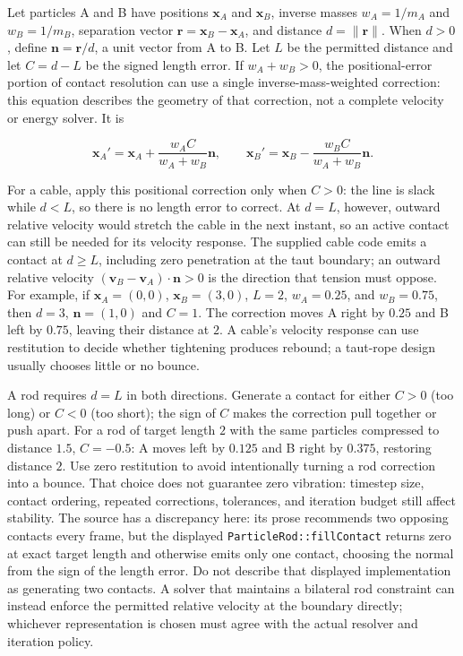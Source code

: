 Let particles A and B have positions \(\mathbf{x}_A\) and \(\mathbf{x}_B\), inverse masses \(w_A=1/m_A\) and \(w_B=1/m_B\), separation vector \(\mathbf{r}=\mathbf{x}_B-\mathbf{x}_A\), and distance \(d=\lVert\mathbf{r}\rVert\). When \(d>0\), define \(\mathbf{n}=\mathbf{r}/d\), a unit vector from A to B. Let \(L\) be the permitted distance and let \(C=d-L\) be the signed length error. If \(w_A+w_B>0\), the positional-error portion of contact resolution can use a single inverse-mass-weighted correction: this equation describes the geometry of that correction, not a complete velocity or energy solver. It is

\[
\mathbf{x}_A' = \mathbf{x}_A + \frac{w_A C}{w_A+w_B}\mathbf{n}, \qquad
\mathbf{x}_B' = \mathbf{x}_B - \frac{w_B C}{w_A+w_B}\mathbf{n}.
\]

For a cable, apply this positional correction only when \(C>0\): the line is slack while \(d<L\), so there is no length error to correct. At \(d=L\), however, outward relative velocity would stretch the cable in the next instant, so an active contact can still be needed for its velocity response. The supplied cable code emits a contact at \(d\geq L\), including zero penetration at the taut boundary; an outward relative velocity \((\mathbf v_B-\mathbf v_A)\cdot\mathbf n>0\) is the direction that tension must oppose. For example, if \(\mathbf{x}_A=(0,0)\), \(\mathbf{x}_B=(3,0)\), \(L=2\), \(w_A=0.25\), and \(w_B=0.75\), then \(d=3\), \(\mathbf{n}=(1,0)\) and \(C=1\). The correction moves A right by \(0.25\) and B left by \(0.75\), leaving their distance at \(2\). A cable's velocity response can use restitution to decide whether tightening produces rebound; a taut-rope design usually chooses little or no bounce.

A rod requires \(d=L\) in both directions. Generate a contact for either \(C>0\) (too long) or \(C<0\) (too short); the sign of \(C\) makes the correction pull together or push apart. For a rod of target length \(2\) with the same particles compressed to distance \(1.5\), \(C=-0.5\): A moves left by \(0.125\) and B right by \(0.375\), restoring distance \(2\). Use zero restitution to avoid intentionally turning a rod correction into a bounce. That choice does not guarantee zero vibration: timestep size, contact ordering, repeated corrections, tolerances, and iteration budget still affect stability. The source has a discrepancy here: its prose recommends two opposing contacts every frame, but the displayed \texttt{ParticleRod::fillContact} returns zero at exact target length and otherwise emits only one contact, choosing the normal from the sign of the length error. Do not describe that displayed implementation as generating two contacts. A solver that maintains a bilateral rod constraint can instead enforce the permitted relative velocity at the boundary directly; whichever representation is chosen must agree with the actual resolver and iteration policy.


